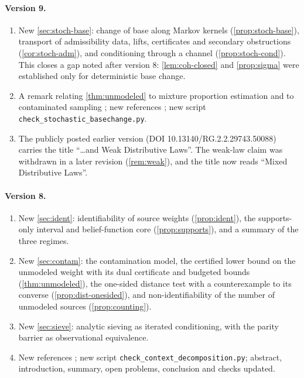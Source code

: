 \documentclass[11pt]{article}
\theoremstyle{definition}
\theoremstyle{remark}
\begin{document}
\paragraph{Version 9.}
\begin{enumerate}[leftmargin=*,label=(\alph*)]
\item New \cref{sec:stoch-base}: change of base along Markov kernels (\cref{prop:stoch-base}), transport
  of admissibility data, lifts, certificates and secondary obstructions (\cref{cor:stoch-adm}), and
  conditioning through a channel (\cref{prop:stoch-cond}). This closes a gap noted after version 8:
  \cref{lem:coh-closed} and \cref{prop:sigma} were established only for deterministic base change.
\item A remark relating \cref{thm:unmodeled} to mixture proportion estimation and to contaminated
  sampling \cite{Blanchard2010,Scott2015,HorowitzManski1995}; new references
  \cite{Awasthi-Attribution,JacobsZanasi2016}; new script \texttt{check\_stochastic\allowbreak\_basechange.py}.
\item The publicly posted earlier version (DOI 10.13140/RG.2.2.29743.50088) carries the title
  ``\ldots and Weak Distributive Laws''. The weak-law claim was withdrawn in a later revision
  (\cref{rem:weak}), and the title now reads ``Mixed Distributive Laws''.
\end{enumerate}

\paragraph{Version 8.}
\begin{enumerate}[leftmargin=*,label=(\alph*)]
\item New \cref{sec:ident}: identifiability of source weights (\cref{prop:ident}), the supports-only
  interval and belief-function core (\cref{prop:supports}), and a summary of the three regimes.
\item New \cref{sec:contam}: the contamination model, the certified lower bound on the unmodeled
  weight with its dual certificate and budgeted bounds (\cref{thm:unmodeled}), the one-sided distance
  test with a counterexample to its converse (\cref{prop:dist-onesided}), and non-identifiability of
  the number of unmodeled sources (\cref{prop:counting}).
\item New \cref{sec:sieve}: analytic sieving as iterated conditioning, with the parity barrier as
  observational equivalence.
\item New references \cite{Chen1973,Csiszar1975,Dempster1967,FriedlanderIwaniec1998,
  FriedlanderIwaniec2010,Gale1957,Huber1964,Shafer1976,Tenenbaum2015}; new script
  \texttt{check\_context\allowbreak\_decomposition.py}; abstract, introduction, summary, open
  problems, conclusion and checks updated.
\end{enumerate}
\end{document}
